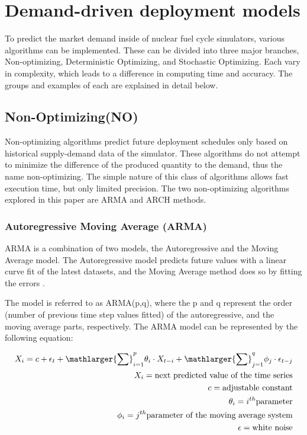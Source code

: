 \section{ Demand-driven deployment models}
To predict the market demand inside of nuclear fuel cycle simulators, various algorithms
can be implemented. These can be divided into three major
branches, Non-optimizing, Deterministic Optimizing, and Stochastic
Optimizing. Each vary in complexity, which leads to a difference
in computing time and accuracy. The groups and examples of each are 
explained in detail below. 

\subsection{Non-Optimizing(NO)}

Non-optimizing algorithms predict future deployment schedules
only based on historical supply-demand data of the simulator. These algorithms do not attempt
to minimize the difference of the produced quantity to the demand,
thus the name non-optimizing. The simple nature of this class of algorithms
allows fast execution time, but only limited precision. The
two non-optimizing algorithms explored in this paper are \gls{ARMA}
and \gls{ARCH} methods. 

\subsubsection{Autoregressive Moving Average (ARMA)}

\gls{ARMA} is a combination of two models, the Autoregressive
and the Moving Average model. The Autoregressive model 
predicts future values with a linear curve fit of the latest
datasets, and the Moving Average method does so by fitting the 
errors \cite{stine_introduction_2011}.

The model is referred to as ARMA(p,q), where the p and q represent 
the order (number of previous time step values fitted) of the autoregressive,
and the moving average parts,
respectively. 
The \gls{ARMA} model can be represented by the following equation:

\begin{align} 
	X_i=c + \epsilon_t + {\mathlarger{\sum}}_{i=1}^{p}\theta_i \cdot X_{t-i}+
	 {\mathlarger{\sum}}_{j=1}^{q}\phi_j\cdot\epsilon_{t-j}\\
	X_i= \mbox{next predicted value of the time series}\\
	c= \mbox{adjustable constant}\\
	\theta_i=i^{th} \mbox{parameter}\\
	\phi_i=j^{th} \mbox{parameter of the moving average system}\\
	\epsilon = \mbox{white noise}
\end{align}


